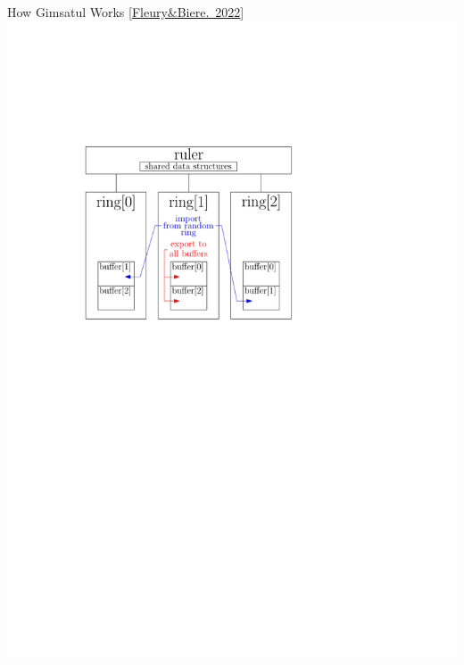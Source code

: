 \documentclass{beamer}
\begin{document}
\begin{frame}{How Gimsatul Works [\href{https://arxiv.org/pdf/2207.13577}{Fleury\&Biere.~2022}]}
    \center
    \includegraphics[scale=.8]{figures/gimsatul_architecture.pdf}
\end{frame}

\end{document}
